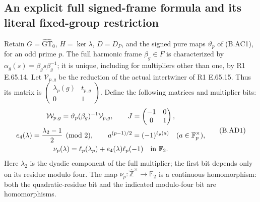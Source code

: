 \subsection{An explicit full signed-frame formula and its literal fixed-group restriction}

Retain $G=\widehat{\mathrm{GT}}_0$, $H=\ker\lambda$,
$D=D_P$, and the signed pure maps $\vartheta_p$ of
(B.AC1), for an odd prime $p$.  The full harmonic frame
$\beta_g\in F$ is characterized by
$\alpha_g(s)=\beta_gs\beta_g^{-1}$; it is unique, including
for multipliers other than one, by R1 E.65.14.
Let $\mathcal V_{p,g}$ be the reduction of the actual
intertwiner of R1 E.65.15.  Thus its matrix is
$\left(\begin{smallmatrix}\lambda_p(g)&t_{p,g}\\0&1\end{smallmatrix}\right)$.
Define the following matrices and multiplier bits:
\[
\begin{gathered}
 \mathcal W_{p,g}=\vartheta_p(\beta_g)^{-1}\mathcal V_{p,g},
 \qquad J=\begin{pmatrix}-1&0\\0&1\end{pmatrix},\\
 e_4(\lambda)=\frac{\lambda_2-1}{2}\pmod2,\qquad
 a^{(p-1)/2}=(-1)^{\ell_p(a)}
       \quad(a\in\mathbb F_p^\times),\\
 \nu_p(\lambda)=\ell_p(\lambda_p)+e_4(\lambda)\ell_p(-1)
                              \quad\hbox{in }\mathbb F_2.
\end{gathered}                                                   \tag{B.AD1}
\]
Here $\lambda_2$ is the dyadic component of the full multiplier;
the first bit depends only on its residue modulo four.
The map $\nu_p:\widehat{\mathbb Z}^{\times}\to\mathbb F_2$
is a continuous homomorphism: both the quadratic-residue
bit and the indicated modulo-four bit are homomorphisms.

